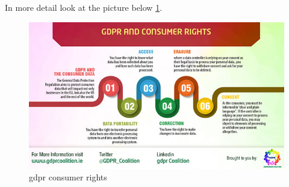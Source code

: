 \documentclass[thesis=M,english]{FITthesis}[2012/06/26]
\begin{document}
In more detail look at the picture below \ref{fig:gdpr_subject_rights}.
\begin{figure}[h!]\centering
	\includegraphics[width=1\textwidth]{pictures/gdpr_subject_rights}
	\caption{\acrshort{gdpr} consumer rights \cite{gdpr_subject_rights}}\label{fig:gdpr_subject_rights}
\end{figure}
\end{document}
